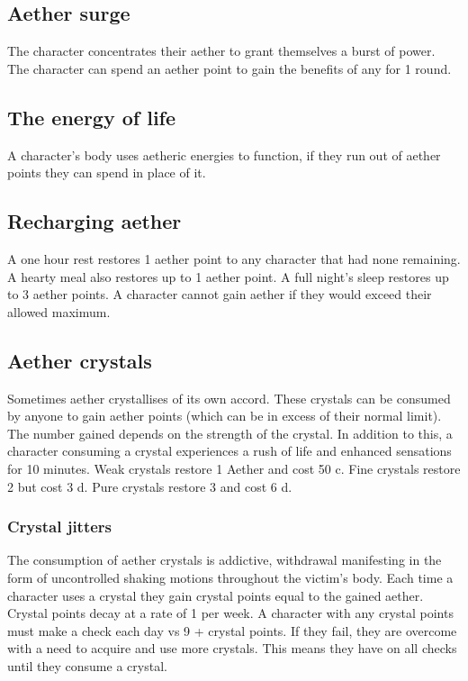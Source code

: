 \documentclass[a4paper,11pt,oneside]{book}
\newcommand{\textlf}[1]{\textbf{\titlecap{#1}}}
\begin{document}
\subsection{Aether surge}
The character concentrates their aether to grant themselves a burst of power. The character can spend an aether point to gain the benefits of any \textlf{perk} for 1 round.

\subsection{The energy of life}
A character's body uses aetheric energies to function, if they run out of aether points they can spend \textlf{endurance} in place of it.

\subsection{Recharging aether}
A one hour rest restores 1 aether point to any character that had none remaining. A hearty meal also restores up to 1 aether point. A full night's sleep restores up to 3 aether points. A character cannot gain aether if they would exceed their allowed maximum.

\subsection{Aether crystals}
Sometimes aether crystallises of its own accord. These crystals can be consumed by anyone to gain aether points (which can be in excess of their normal limit). The number gained depends on the strength of the crystal. In addition to this, a character consuming a crystal experiences a rush of life and enhanced sensations for 10 minutes. Weak crystals restore 1 Aether and cost 50 c. Fine crystals restore 2 but cost 3 d. Pure crystals restore 3 and cost 6 d.
\subsubsection{Crystal jitters}
The consumption of aether crystals is addictive, withdrawal manifesting in the form of uncontrolled shaking motions throughout the victim's body. Each time a character uses a crystal they gain crystal points equal to the gained aether. Crystal points decay at a rate of 1 per week. A character with any crystal points must make a \textlf{resolve} check each day vs 9 + crystal points. If they fail, they are overcome with a need to acquire and use more crystals. This means they have \textlf{edge-} on all checks until they consume a crystal.   
\end{document}
